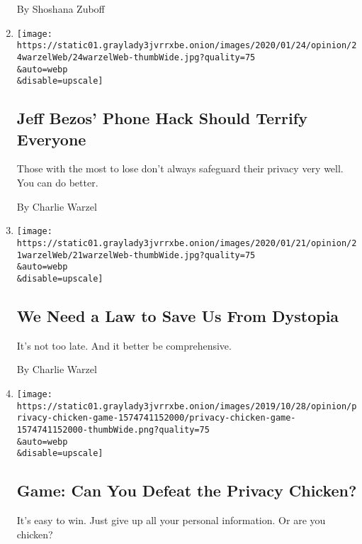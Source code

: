 \begin{enumerate}
  By Shoshana Zuboff
\item
  \href{/2020/01/24/opinion/jeff-bezos-phone-hack.html}{}

  \texttt{[image: https://static01.graylady3jvrrxbe.onion/images/2020/01/24/opinion/24warzelWeb/24warzelWeb-thumbWide.jpg?quality=75\\\&auto=webp\\\&disable=upscale]}

  \hypertarget{jeff-bezos-phone-hack-should-terrify-everyone}{%
  \subsection{Jeff Bezos' Phone Hack Should Terrify
  Everyone}\label{jeff-bezos-phone-hack-should-terrify-everyone}}

  Those with the most to lose don't always safeguard their privacy very
  well. You can do better.

  By Charlie Warzel
\item
  \href{/2020/01/21/opinion/facial-recognition-privacy-law.html}{}

  \texttt{[image: https://static01.graylady3jvrrxbe.onion/images/2020/01/21/opinion/21warzelWeb/21warzelWeb-thumbWide.jpg?quality=75\\\&auto=webp\\\&disable=upscale]}

  \hypertarget{we-need-a-law-to-save-us-from-dystopia}{%
  \subsection{We Need a Law to Save Us From
  Dystopia}\label{we-need-a-law-to-save-us-from-dystopia}}

  It's not too late. And it better be comprehensive.

  By Charlie Warzel
\item
  \href{/interactive/2020/01/21/opinion/privacy-chicken-game.html}{}

  \texttt{[image: https://static01.graylady3jvrrxbe.onion/images/2019/10/28/opinion/privacy-chicken-game-1574741152000/privacy-chicken-game-1574741152000-thumbWide.png?quality=75\\\&auto=webp\\\&disable=upscale]}

  \hypertarget{game-can-you-defeat-the-privacy-chicken}{%
  \subsection{Game: Can You Defeat the Privacy
  Chicken?}\label{game-can-you-defeat-the-privacy-chicken}}

  It's easy to win. Just give up all your personal information. Or are
  you chicken?


\end{enumerate}
